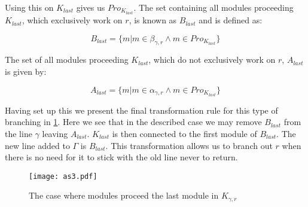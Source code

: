 Using this on $K_{last}$ gives us $Pro_{K_{last}}$. The set containing all modules proceeding $K_{last}$, which exclusively work on $r$, is known as $B_{last}$ and is defined as:

\[B_{last} = \{m | m \in \beta_{\gamma ,r}  \land m \in Pro_{K_{last}} \}\]

The set of all modules proceeding $K_{last}$, which do not exclusively work on $r$, $A_{last}$ is given by:

\[ A_{last} = \{m | m \in \alpha_{\gamma ,r}  \land m \in Pro_{K_{last}} \} \]

Having set up this we present the final transformation rule for this type of branching in \cref{fig:asbranchout}. Here we see that in the described case we may remove $B_{last}$ from the line $\gamma$ leaving  $A_{last}$. $K_{last}$ is then connected to the first module of $B_{last}$. The new line added to $\Gamma$ is $B_{last}$. This transformation allows us to branch out $r$ when there is no need for it to stick with the old line never to return.


\begin{figure}[h]
\centering
\texttt{[image: as3.pdf]}
\caption{The case where modules proceed the last module in $K_{\gamma ,r}$}
\label{fig:asbranchout}
\end{figure}
